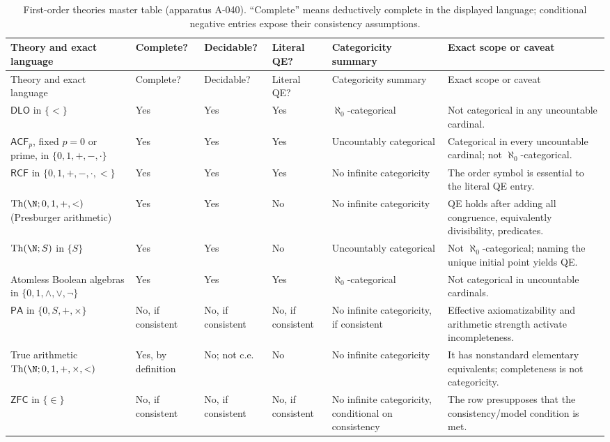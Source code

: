 \begin{landscape}
\begingroup\tiny\setlength{\tabcolsep}{3pt}
\begin{longtable}{@{}p{1.15in}p{1.05in}p{.62in}p{.65in}p{.95in}p{2.64in}@{}}
\caption{First-order theories master table (apparatus A-040).  ``Complete''
means deductively complete in the displayed language; conditional negative
entries expose their consistency assumptions.}
\label{tab:p03-first-order-theories}\\
\toprule
Theory and exact language & Complete? & Decidable? & Literal QE? & Categoricity summary & Exact scope or caveat \\
\midrule\endfirsthead
\toprule
Theory and exact language & Complete? & Decidable? & Literal QE? & Categoricity summary & Exact scope or caveat \\
\midrule\endhead
\(\mathsf{DLO}\) in \(\{<\}\) & Yes & Yes & Yes & \(\aleph_0\)-categorical & Not categorical in any uncountable cardinal. \\
\addlinespace
\(\mathsf{ACF}_p\), fixed \(p=0\) or prime, in \(\{0,1,+,-,\mathbin{\cdot}\}\) & Yes & Yes & Yes & Uncountably categorical & Categorical in every uncountable cardinal; not \(\aleph_0\)-categorical. \\
\addlinespace
\(\mathsf{RCF}\) in \(\{0,1,+,-,\mathbin{\cdot},<\}\) & Yes & Yes & Yes & No infinite categoricity & The order symbol is essential to the literal QE entry. \\
\addlinespace
\(\operatorname{Th}(\N;0,1,+,<)\) (Presburger arithmetic) & Yes & Yes & No & No infinite categoricity & QE holds after adding all congruence, equivalently divisibility, predicates. \\
\addlinespace
\(\operatorname{Th}(\N;S)\) in \(\{S\}\) & Yes & Yes & No & Uncountably categorical & Not \(\aleph_0\)-categorical; naming the unique initial point yields QE. \\
\addlinespace
Atomless Boolean algebras in \(\{0,1,\wedge,\vee,\neg\}\) & Yes & Yes & Yes & \(\aleph_0\)-categorical & Not categorical in uncountable cardinals. \\
\addlinespace
\(\mathsf{PA}\) in \(\{0,S,+,\times\}\) & No, if consistent & No, if consistent & No, if consistent & No infinite categoricity, if consistent & Effective axiomatizability and arithmetic strength activate incompleteness. \\
\addlinespace
True arithmetic \(\operatorname{Th}(\N;0,1,+,\times,<)\) & Yes, by definition & No; not c.e. & No & No infinite categoricity & It has nonstandard elementary equivalents; completeness is not categoricity. \\
\addlinespace
\(\mathsf{ZFC}\) in \(\{\in\}\) & No, if consistent & No, if consistent & No, if consistent & No infinite categoricity, conditional on consistency & The row presupposes that the consistency/model condition is met. \\
\bottomrule
\end{longtable}
\endgroup
\end{landscape}

